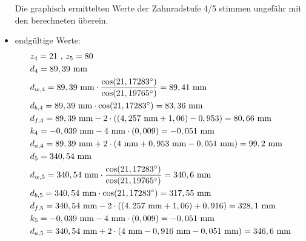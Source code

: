 \begin{itemize}
Die graphisch ermittelten Werte der Zahnradstufe 4/5 stimmen ungefähr mit den berechneten überein. \\
\item endgültige Werte:
\begin{align*}
	&z_4 = 21 \text{ , } z_5 = 80 \\
	&d_4 = 89,39 \text{ mm} \\
	&d_{w,4} = 89,39  \text{ mm}\cdot \frac{\cos(21,17283^\circ)}{\cos(21,19765^\circ)} = 89,41  \text{ mm}\\
	&d_{b,4} = 89,39  \text{ mm} \cdot \cos(21,17283^\circ) = 83,36  \text{ mm}\\
	&d_{f,4} = 89,39  \text{ mm} -2 \cdot ((4,257 \text{ mm}+1,06)-0,953) = 80,66 \text{ mm}\\
	&k_4 = -0,039 \text{ mm} -4 \text{ mm} \cdot (0,009) =- 0,051 \text{ mm}\\
	&d_{a,4} = 89,39  \text{ mm} +2 \cdot (4\text{ mm}+0,953 \text{ mm} -0,051 \text{ mm}) = 99,2\text{ mm}\\
	&d_5 =340,54 \text{ mm} \\
	&d_{w,5} = 340,54  \text{ mm}\cdot \frac{\cos(21,17283^\circ)}{\cos(21,19765^\circ)} = 340,6  \text{ mm}\\
	&d_{b,5} = 340,54  \text{ mm} \cdot \cos(21,17283^\circ) = 317,55  \text{ mm}\\
	&d_{f,5} = 340,54  \text{ mm} -2 \cdot ((4,257 \text{ mm}+1,06)+0,916) = 328,1 \text{ mm}\\
	&k_5 = -0,039 \text{ mm} -4 \text{ mm} \cdot (0,009) =- 0,051 \text{ mm}\\
	&d_{a,5} = 340,54  \text{ mm} +2 \cdot (4\text{ mm}-0,916 \text{ mm} -0,051 \text{ mm}) = 346,6\text{ mm}
\end{align*}
\end{itemize}
